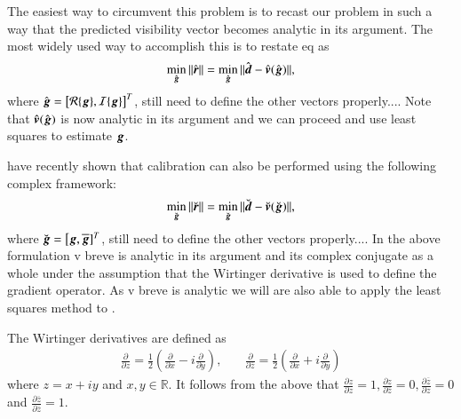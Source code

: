 \documentclass[a4paper,fleqn,usenatbib]{mnras}
\newcommand{\br}{\bmath{r}}
\newcommand{\bg}{\bmath{g}}
\newcommand{\bd}{\bmath{d}}
\newcommand{\bv}{\bmath{v}}
\newcommand{\conj}[1]{\overline{#1}}
\begin{document}
The easiest way to circumvent this problem is to recast our problem in such a way that the predicted visibility vector becomes analytic in its argument.
The most widely used way to accomplish this is to restate eq as
\begin{equation}
\min_{\hat{\bg}}\|\hat{\br}\| = \min_{\hat{\bg}}\|\hat{\bd} - \hat{\bv}(\hat{\bg})\|, 
\end{equation}
where $\hat{\bg} = \big[\mathcal{R}\{\bg\},\mathcal{I}\{\bg\}\big]^T$, still need to define the other vectors properly....
Note that $\hat{\bv}(\hat{\bg})$ is now analytic in its argument and we can proceed and use least squares to estimate $\bg$. 

\citet{Smirnov2015} have recently shown that calibration can also be performed using the following complex framework: 
\begin{equation}
\min_{\breve{\bg}}\|\breve{\br}\| = \min_{\breve{\bg}}\|\breve{\bd} - \breve{\bv}(\breve{\bg})\|, 
\end{equation}
where $\breve{\bg} = \big[\bg,\conj{\bg}]^T$, still need to define the other vectors properly....
In the above formulation v breve is analytic in its argument and its complex conjugate as a whole under the assumption that the Wirtinger derivative
is used to define the gradient operator. As v breve is analytic we will are also able to apply the least squares method to .   

The Wirtinger derivatives are defined as
\begin{eqnarray}
\frac{\partial}{\partial z} = \frac{1}{2}\left ( \frac{\partial}{\partial x} -  i \frac{\partial}{\partial y} \right ),&~&\frac{\partial}{\partial \conj{z}} = \frac{1}{2}\left ( \frac{\partial}{\partial x} +  i \frac{\partial}{\partial y} \right ) 
\end{eqnarray}
where $z = x + iy$ and $x,y \in \mathbb{R}$. It follows from the above that $\frac{\partial z}{\partial z} = 1,\frac{\partial z}{\partial \conj{z}} = 0,\frac{\partial \conj{z}}{\partial z} = 0$ and $\frac{\partial \conj{z}}{\partial \conj{z}} = 1$.





\end{document}
